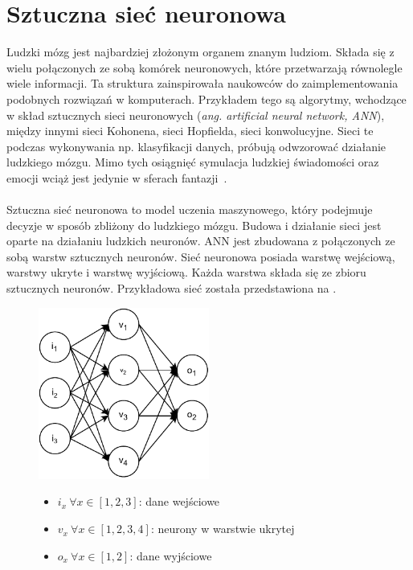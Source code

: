 \section{Sztuczna sieć neuronowa}
\label{sec:snn}
Ludzki mózg jest najbardziej złożonym organem znanym ludziom. Składa się z wielu połączonych ze sobą komórek neuronowych, które przetwarzają równolegle wiele informacji. Ta struktura zainspirowała naukowców do zaimplementowania podobnych rozwiązań w komputerach. Przykładem tego są algorytmy, wchodzące w skład sztucznych sieci neuronowych (\textit{ang. artificial neural network, ANN}), między innymi sieci Kohonena, sieci Hopfielda, sieci konwolucyjne. Sieci te podczas wykonywania np. klasyfikacji danych, próbują odwzorować działanie ludzkiego mózgu. Mimo tych osiągnięć symulacja ludzkiej świadomości oraz emocji wciąż jest jedynie w sferach fantazji~\cite{Wang2003}.
\\ \\
Sztuczna sieć neuronowa to model uczenia maszynowego, który podejmuje decyzje w sposób zbliżony do ludzkiego mózgu. Budowa i działanie sieci jest oparte na działaniu ludzkich neuronów. ANN jest zbudowana z połączonych ze sobą warstw sztucznych neuronów. Sieć neuronowa posiada warstwę wejściową, warstwy ukryte i warstwę wyjściową. Każda warstwa składa się ze zbioru sztucznych neuronów. Przykładowa sieć została przedstawiona na .
\begin{figure}[H]
    \centering
    \includegraphics[width=0.5\textwidth]{images/neural-network}
    \begin{itemize}
        \item[] $i_x \ \forall x \in [1, 2, 3]$: dane wejściowe
        \item[] $v_x \ \forall x \in [1, 2, 3, 4]$: neurony w warstwie ukrytej
        \item[] $o_x \ \forall x \in [1, 2]$: dane wyjściowe
    \end{itemize}
    \label{fig:neural-network}
\end{figure}
